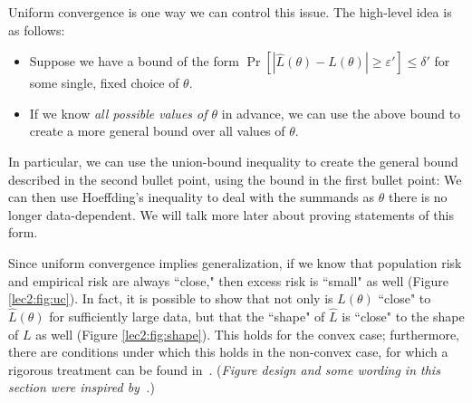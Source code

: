 
Uniform convergence is one way we can control this issue. The high-level idea is as follows: 
\begin{itemize}
    \item Suppose we have a bound of the form $\Pr[|\hat{L}(\theta) - L(\theta)| \geq \varepsilon'] \leq \delta'$ for some single, fixed choice of $\theta$.
    \item If we know \emph{all possible values of $\theta$} in advance, we can use the above bound to create a more general bound over all values of $\theta$.
\end{itemize}
In particular, we can use the union-bound inequality to create the general bound described in the second bullet point, using the bound in the first bullet point:
We can then use Hoeffding's inequality to deal with the summands as $\theta$ there is no longer data-dependent. We will talk more later about proving statements of this form.


Since uniform convergence implies generalization, if we know that population risk and empirical risk are always ``close," then excess risk is ``small" as well (Figure \ref{lec2:fig:uc}). In fact, it is possible to show that not only is $L(\theta)$ ``close" to $\hat{L}(\theta)$ for sufficiently large data, but that the ``shape" of $\hat{L}$ is ``close" to the shape of $L$ as well (Figure \ref{lec2:fig:shape}). This holds for the convex case; furthermore, there are conditions under which this holds in the non-convex case, for which a rigorous treatment can be found in~\cite{mei2017landscape}. (\emph{Figure design and some wording in this section were inspired by~\cite{percynotes, thomasliu2018}.})

